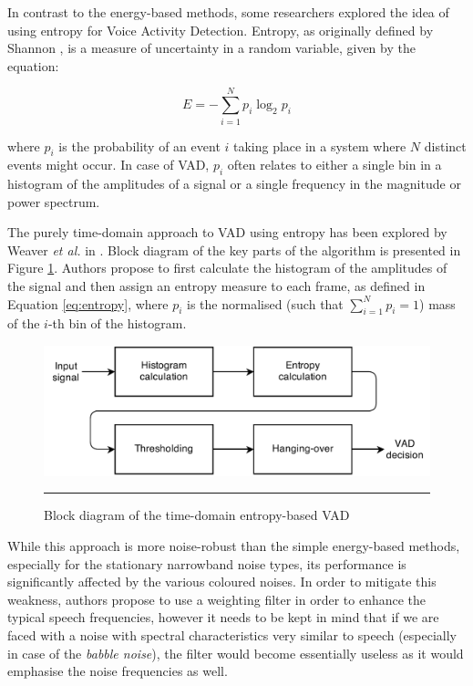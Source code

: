 In contrast to the energy-based methods, some researchers explored the idea of using entropy for Voice Activity Detection. Entropy, as originally defined by Shannon \cite{Shannon}, is a measure of uncertainty in a random variable, given by the equation:

\begin{equation}
E = - \sum_{i=1}^{N} p_i \log_2 p_i
\label{eq:entropy}
\end{equation}

where $p_i$ is the probability of an event $i$ taking place in a system where $N$ distinct events might occur. In case of VAD, $p_i$ often relates to either a single bin in a histogram of the amplitudes of a signal or a single frequency in the magnitude or power spectrum.

The purely time-domain approach to VAD using entropy has been explored by Weaver \emph{et al.} in \cite{Weaver}. Block diagram of the key parts of the algorithm is presented in Figure \ref{fig:Weaver}. Authors propose to first calculate the histogram of the amplitudes of the signal and then assign an entropy measure to each frame, as defined in Equation \ref{eq:entropy}, where $p_i$ is the normalised (such that $\sum_{i=1}^{N} p_i = 1$) mass of the $i$-th bin of the histogram.

\begin{figure}[htbp]
	\centering
		\includegraphics[width=0.9\columnwidth]{Figures/Weaver.png}
		\rule{37em}{0.5pt}
	\caption[Block diagram of the time-domain entropy-based VAD]{Block diagram of the time-domain entropy-based VAD \cite{Weaver}}
	\label{fig:Weaver}
\end{figure}

While this approach is more noise-robust than the simple energy-based methods, especially for the stationary narrowband noise types, its performance is significantly affected by the various coloured noises. In order to mitigate this weakness, authors propose to use a weighting filter in order to enhance the typical speech frequencies, however it needs to be kept in mind that if we are faced with a noise with spectral characteristics very similar to speech (especially in case of the \emph{babble noise}), the filter would become essentially useless as it would emphasise the noise frequencies as well.

